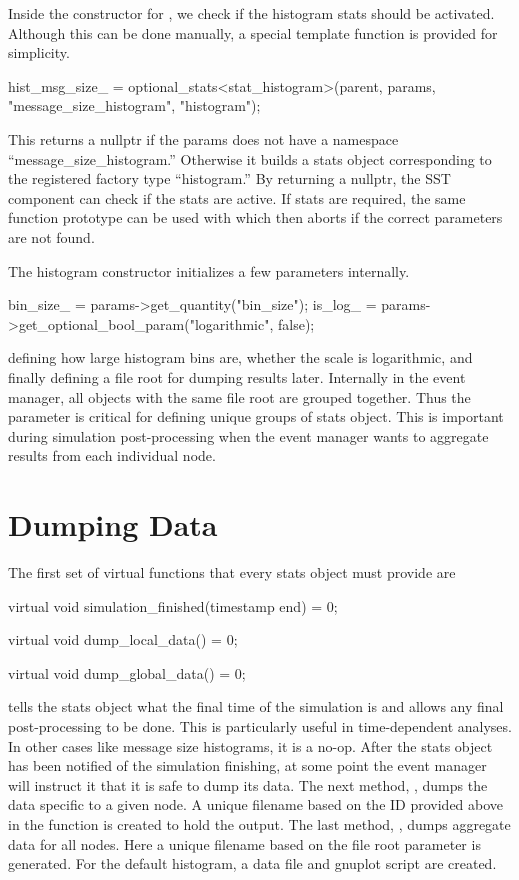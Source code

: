 Inside the constructor for , we check if the histogram stats should be activated.
Although this can be done manually, a special template function is provided for simplicity.


\begin{CppCode}
hist_msg_size_ = optional_stats<stat_histogram>(parent,
        params, "message_size_histogram", "histogram");
\end{CppCode}
This returns a nullptr if the params does not have a namespace ``message\_size\_histogram.''  Otherwise it builds a stats object corresponding to the registered factory type ``histogram.'' By returning a nullptr, the SST component can check if the stats are active.  If stats are required, the same function prototype can be used with  which then aborts if the correct parameters are not found. 

The histogram constructor initializes a few parameters internally.

\begin{CppCode}
bin_size_ = params->get_quantity("bin_size");
is_log_ = params->get_optional_bool_param("logarithmic", false);
\end{CppCode}
defining how large histogram bins are, whether the scale is logarithmic, and finally defining a file root for dumping results later.
Internally in the event manager, all objects with the same file root are grouped together.
Thus the  parameter is critical for defining unique groups of stats object.
This is important during simulation post-processing when the event manager wants to aggregate results from each individual node.

\section{Dumping Data}\label{sec:dumping}
The first set of virtual functions that every stats object must provide are

\begin{CppCode}
virtual void simulation_finished(timestamp end) = 0;

virtual void dump_local_data() = 0;

virtual void dump_global_data() = 0;
\end{CppCode}

 tells the stats object what the final time of the simulation is and allows any final post-processing to be done.
This is particularly useful in time-dependent analyses.  In other cases like message size histograms, it is a no-op.
After the stats object has been notified of the simulation finishing, at some point the event manager will instruct it that it is safe to dump its data.
The next method, , dumps the data specific to a given node.
A unique filename based on the ID provided above in the  function is created to hold the output.
The last method, , dumps aggregate data for all nodes.
Here a unique filename based on the file root parameter is generated.
For the default histogram, a data file and gnuplot script are created.


